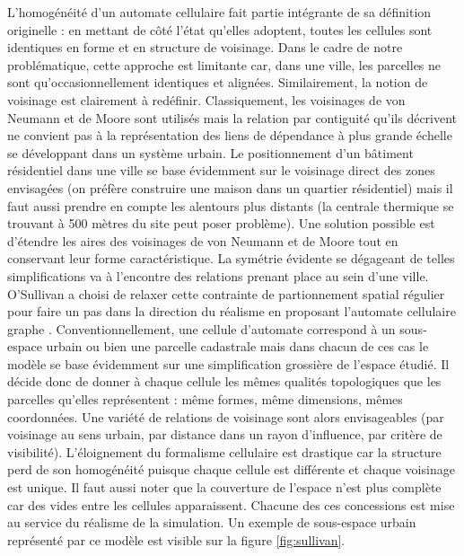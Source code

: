 \documentclass[12pt]{article}
\begin{document}
L'homogénéité d'un automate cellulaire fait partie intégrante de sa
définition originelle : en mettant de côté l'état qu'elles adoptent,
toutes les cellules sont identiques en forme et en structure de
voisinage. Dans le cadre de notre problématique, cette approche est
limitante car, dans une ville, les parcelles ne sont
qu'occasionnellement identiques et alignées. Similairement, la notion
de voisinage est clairement à redéfinir. Classiquement, les voisinages
de von Neumann et de Moore sont utilisés mais la relation par
contiguité qu'ils décrivent ne convient pas à la représentation des
liens de dépendance à plus grande échelle se développant dans un
système urbain. Le positionnement d'un bâtiment résidentiel dans une
ville se base évidemment sur le voisinage direct des zones envisagées
(on préfère construire une maison dans un quartier résidentiel) mais
il faut aussi prendre en compte les alentours plus distants (la
centrale thermique se trouvant à 500 mètres du site peut poser
problème). Une solution possible est d'étendre les aires des
voisinages de von Neumann et de Moore tout en conservant leur forme
caractéristique. La symétrie évidente se dégageant de telles
simplifications va à l'encontre des relations prenant place au sein
d'une ville. O'Sullivan a choisi de relaxer cette contrainte de
partionnement spatial régulier pour faire un pas dans la direction du
réalisme en proposant l'automate cellulaire graphe
\cite{O'Sullivan2000,O'Sullivan2001}. Conventionnellement, une cellule
d'automate correspond à un sous-espace urbain ou bien une parcelle
cadastrale mais dans chacun de ces cas le modèle se base évidemment
sur une simplification grossière de l'espace étudié. Il décide donc de
donner à chaque cellule les mêmes qualités topologiques que les
parcelles qu'elles représentent : même formes, même dimensions, mêmes
coordonnées. Une variété de relations de voisinage sont alors
envisageables (par voisinage au sens urbain, par distance dans un
rayon d'influence, par critère de visibilité). L'éloignement du
formalisme cellulaire est drastique car la structure perd de son
homogénéité puisque chaque cellule est différente et chaque voisinage
est unique. Il faut aussi noter que la couverture de l'espace n'est
plus complète car des vides entre les cellules apparaissent. Chacune
des ces concessions est mise au service du réalisme de la
simulation. Un exemple de sous-espace urbain représenté par ce modèle
est visible sur la figure \ref{fig:sullivan}.
\end{document}

